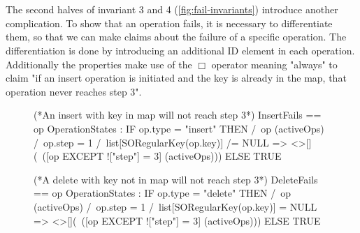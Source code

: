 \documentclass{uit-thesis}
\begin{document}
\\\\
The second halves of invariant 3 and 4 (\autoref{fig:fail-invariants}) introduce another complication. To show that an operation fails, it is necessary to differentiate them, so that we can make claims about the failure of a specific operation. The differentiation is done by introducing an additional ID element in each operation. Additionally the properties make use of the $\Box$ operator meaning "always" to claim "if an insert operation is initiated and the key is already in the map, that operation never reaches step 3".
\begin{figure}[h]
    \begin{tla}
(*An insert with key in map will not reach step 3*)
InsertFails ==
    \A op \in OperationStates :
        IF op.type = "insert"
        THEN
            /\ op \in (activeOps)
            /\ op.step = 1
            /\ list[SORegularKey(op.key)] /= NULL
         => <>[](~([op EXCEPT !["step"] = 3] \in (activeOps)))
        ELSE TRUE

(*A delete with key not in map will not reach step 3*)
DeleteFails ==
    \A op \in OperationStates :
            IF op.type = "delete"
            THEN
                /\ op \in (activeOps)
                /\ op.step = 1
                /\ list[SORegularKey(op.key)] = NULL
            => <>[](~([op EXCEPT !["step"] = 3] \in (activeOps)))
            ELSE TRUE


\end{tla}
\end{figure}
\end{document}
